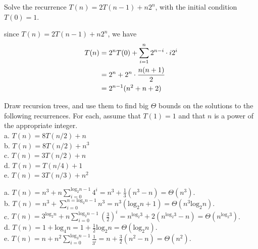 \documentclass[11pt, a4paper, UTF8]{ctexart}
\begin{document}
\begin{problem}[CS: 4.2.11]
  Solve the recurrence $T(n) = 2T(n - 1) + n2^{n}$, with the initial condition 
  $T(0) = 1$.
\end{problem}

\begin{solution}
  since $T(n) = 2T(n - 1) + n2^{n}$, we have
  \begin{align}
    T(n) & = 2^{n}T(0) + \sum_{i = 1}^{n} 2^{n - i} \cdot i2^{i} \notag \\
         & = 2^{n} + 2^{n} \cdot \frac{n(n + 1)}{2} \notag \\
         & = 2^{n - 1}(n^{2} + n + 2) \notag
  \end{align}
\end{solution}

\begin{problem}[CS: 4.5.9]
  Draw recursion trees, and use them to find big $\Theta$ bounds on the solutions 
  to the following recurrences. For each, assume that $T(1) = 1$ and that $n$ 
  is a power of the appropriate integer.\\
  a. $T(n) = 8T(n/2) + n$\\
  b. $T(n) = 8T(n/2) + n^{3}$\\
  c. $T(n) = 3T(n/2) + n$\\
  d. $T(n) = T(n/4) + 1$\\
  e. $T(n) = 3T(n/3) + n^{2}$
\end{problem}

\begin{solution}
  a. 
  $T(n) = n^{3} + n \sum_{i = 0}^{\text{log}_{2}n - 1} 4^{i} = n^{3} + \frac{1}{3} (n^{3} - n) 
  = \Theta (n^{3})$.\\
  b. 
  $T(n) = n^{3} + \sum_{i = 0}^{n = \text{log}_{2}n - 1} n^{3} = n^{3}(\text{log}_{2}n + 1) 
  = \Theta (n^{3}\text{log}_{2}n)$.\\
  c. 
  $T(n) = 3^{\text{log}_{2}n} + n \sum_{i = 0}^{\text{log}_{2}n - 1} (\frac{3}{2})^{i} 
  = n^{\text{log}_{2}3} + 2(n^{\text{log}_{2}3} - n) = \Theta (n^{\text{log}_{2}3})$.\\
  d. 
  $T(n) = 1 + \text{log}_{4}n = 1 + \frac{1}{2} \text{log}_{2}n = \Theta (\text{log}_{2}n)$.\\
  e. 
  $T(n) = n + n^{2}\sum_{i = 0}^{\text{log}_{3}n - 1} \frac{1}{3^{i}} = n + \frac{3}{2}(n^{2} - n) 
  = \Theta (n^{2})$.
\end{solution}
\end{document}
